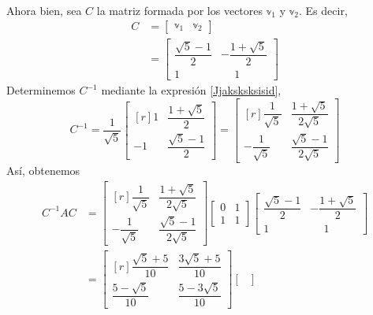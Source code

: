 \begin{example}
\begin{align*}
    \end{align*}
    Ahora bien, sea $C$ la matriz formada por los vectores $\mathbb{v}_1$ y $\mathbb{v}_2$. Es decir,
    \begin{align*}
        C & = \begin{bmatrix} \mathbb{v}_1 & \mathbb{v}_2 \end{bmatrix} \\
        & = \begin{bmatrix} \dfrac{\sqrt{5} - 1}{2} & -\dfrac{1 + \sqrt{5}}{2} \\[3mm] 1 & \phantom{-} 1 \end{bmatrix}
    \end{align*}
    Determinemos $C^{-1}$ mediante la expresión \ref{Jjaksksksisid},
    $$C^{-1} = \frac{1}{\sqrt{5}} \begin{bmatrix*}[r]
        1 & \dfrac{1 + \sqrt{5}}{2} \\[3mm]
        -1 & \dfrac{\sqrt{5} - 1}{2}
    \end{bmatrix*} = \begin{bmatrix*}[r]
        \dfrac{1}{\sqrt{5}} & \dfrac{1 + \sqrt{5}}{2\sqrt{5}} \\[3mm]
        -\dfrac{1}{\sqrt{5}} & \dfrac{\sqrt{5} - 1}{2\sqrt{5}}
    \end{bmatrix*}$$\newpage\noindent
    Así, obtenemos
    \begin{align*}
        C^{-1}AC & = \begin{bmatrix*}[r]
            \dfrac{1}{\sqrt{5}} & \dfrac{1 + \sqrt{5}}{2\sqrt{5}} \\[3mm]
            -\dfrac{1}{\sqrt{5}} & \dfrac{\sqrt{5} - 1}{2\sqrt{5}}
        \end{bmatrix*} \begin{bmatrix}
            0 & 1 \\
            1 & 1
        \end{bmatrix} \begin{bmatrix}
            \dfrac{\sqrt{5} - 1}{2} & -\dfrac{1 + \sqrt{5}}{2} \\[3mm]
            1 & \phantom{-} 1
        \end{bmatrix} \\
        & = \begin{bmatrix*}[r]
            \dfrac{\sqrt{5} + 5}{10} & \dfrac{3\sqrt{5} + 5}{10} \\[3mm]
            \dfrac{5 - \sqrt{5}}{10} & \dfrac{5 - 3\sqrt{5}}{10}
        \end{bmatrix*} \begin{bmatrix}

\end{bmatrix}
\end{align*}
\end{example}
